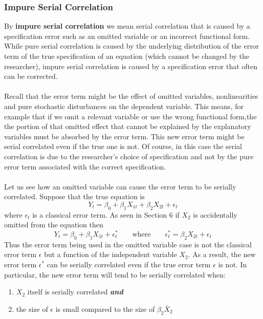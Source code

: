 \documentclass[11pt]{article}
\begin{document}
\subsubsection{Impure Serial Correlation}
By \textbf{impure serial correlation} we mean serial correlation that is caused by a specification error such as an omitted variable or an incorrect functional form. While pure serial correlation is caused by the underlying distribution of the error term of the true specification of an equation (which cannot be changed by the researcher), impure serial correlation is caused by a specification error that often can be corrected.\\ \\
Recall that the error term might be the effect of omitted variables, nonlinearities and pure stochastic disturbances on the dependent variable. This means, for example that if we omit a relevant variable or use the wrong functional form,the the portion of that omitted effect that cannot be explained by the explanatory variables must be absorbed by the error term. This new error term might be serial correlated even if the true one is not. Of course, in this case the serial correlation is due to the researcher's choice of specification and not by the pure error term associated with the correct specification.\\ \\
Let us see how an omitted variable can cause the error term to be serially correlated. Suppose that the true equation is
$$
Y_t = \beta_0 + \beta_1X_{1t} + \beta_2X_{2t} + \epsilon_t
$$
where $\epsilon_t$ is a classical error term. As seen in Section 6 if $X_2$ is accidentally omitted from the equation then
\begin{equation}
Y_t = \beta_0 + \beta_1X_{1t} + \epsilon_t^* \quad\quad \text{where} \quad\quad \epsilon_t^* = \beta_2X_{2t} + \epsilon_t \label{eg9_3}
\end{equation}
Thus the error term being used in the omitted variable case is not the classical error term $\epsilon$ but a function of the independent variable $X_2$. As a result, the new error term $\epsilon^*$ can be serially correlated even if the true error term $\epsilon$ is not. In particular, the new error term will tend to be serially correlated when:
\begin{enumerate}
\item $X_2$ itself is serially correlated \textit{\textbf{and}}
\item the size of $\epsilon$ is small compared to the size of $\beta_2\bar{X}_2$
\end{enumerate}
\end{document}
